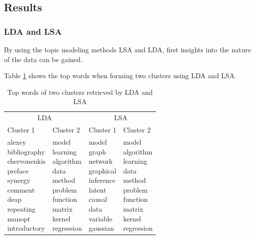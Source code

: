 \subsection{Results}

\subsubsection{LDA and LSA}
By using the topic modeling methods LSA and LDA, first insights into the nature of the data can be gained.

Table \ref{tab:lda_lsa_topwords} shows the top words when forming two clusters using LDA and LSA.
\begin{table}[]
    \centering
    \caption{Top words of two clusters retrieved by LDA and LSA}
    \begin{tabular}{l|l|l|l}
        \multicolumn{2}{c}{LDA} & \multicolumn{2}{c}{LSA} \\
        Cluster 1 & Cluster 2 & Cluster 1 & Cluster 2\\
        \hline
        \shortstack[l]{alexey \\ bibliography \\ chervonenkis \\ preface \\ synergy \\ comment \\ deap \\ repeating \\ manopt \\ introductory} & \shortstack[l]{model \\ learning \\ algorithm \\ data \\ method \\ problem \\ function \\ matrix \\ kernel \\ regression} & \shortstack[l]{model \\ graph \\ network \\ graphical \\ inference \\ latent \\ causal \\ data \\ variable \\ gaussian} & \shortstack[l]{model \\ algorithm \\ learning \\ data \\ method \\ problem \\ function \\ matrix \\ kernel \\ regression} 
    \end{tabular}
    \label{tab:lda_lsa_topwords}
\end{table}
